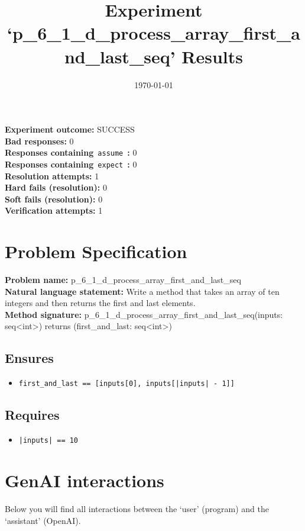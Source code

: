 \documentclass{article}
\begin{document}
\title{Experiment `p\_6\_1\_d\_process\_array\_first\_and\_last\_seq' Results}
\author{\today}
\date{}
\maketitle
\textbf{Experiment outcome: }SUCCESS
\\\textbf{Bad responses: }0
\\\textbf{Responses containing}~\texttt{assume}~\textbf{: }0
\\\textbf{Responses containing}~\texttt{expect}~\textbf{: }0
\\\textbf{Resolution attempts: }1
\\\textbf{Hard fails (resolution): }0
\\\textbf{Soft fails (resolution): }0
\\\textbf{Verification attempts: }1
\section*{Problem Specification}
\textbf{Problem name: }p\_6\_1\_d\_process\_array\_first\_and\_last\_seq
\\\textbf{Natural language statement: }Write a method that takes an array of ten integers and then returns the first and last elements.
\\\textbf{Method signature: }p\_6\_1\_d\_process\_array\_first\_and\_last\_seq(inputs: seq<int>) returns (first\_and\_last: seq<int>)
\subsection*{Ensures}
\begin{itemize}
\item \texttt{first\_and\_last == [inputs[0], inputs[|inputs| - 1]]}
\end{itemize}
\subsection*{Requires}
\begin{itemize}
\item \texttt{|inputs| == 10}
\end{itemize}
\clearpage
\section*{GenAI interactions}
Below you will find all interactions between the `user' (program) and the `assistant' (OpenAI).
\end{document}
